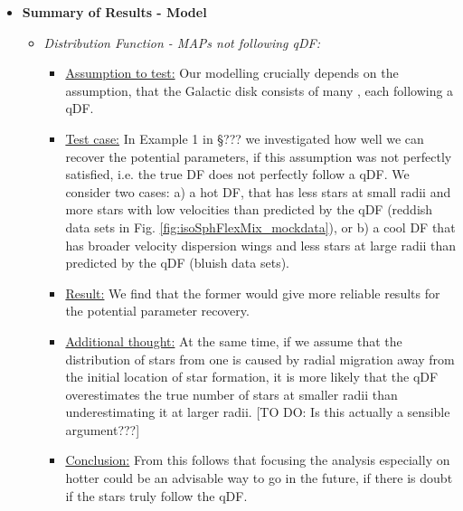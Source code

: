 \begin{itemize}
\item \textbf{Summary of Results - Model}

\begin{itemize}
\item \emph{Distribution Function - MAPs not following qDF:} 
\begin{itemize}
\item \underline{Assumption to test:} Our modelling crucially depends on the assumption, that the Galactic disk consists of many \MAPs, each following a qDF. 
\item \underline{Test case:} In Example 1 in \S ??? we investigated how well we can recover the potential parameters, if this assumption was not perfectly satisfied, i.e. the \MAPs true DF does not perfectly follow a qDF. We consider two cases: a) a hot DF, that has less stars at small radii and more stars with low velocities than predicted by the qDF (reddish data sets in Fig. \ref{fig:isoSphFlexMix_mockdata}), or b) a cool DF that has broader velocity dispersion wings and less stars at large radii than predicted by the qDF (bluish data sets). 
\item \underline{Result:} We find that the former would give more reliable results for the potential parameter recovery.
\item \underline{Additional thought:} At the same time, if we assume that the distribution of stars from one \MAP is caused by radial migration away from the initial location of star formation, it is more likely that the qDF overestimates the true number of stars at smaller radii than underestimating it at larger radii. [TO DO: Is this actually a sensible argument???] 
\item \underline{Conclusion:} From this follows that focusing the analysis especially on hotter \MAPs could be an advisable way to go in the future, if there is doubt if the stars truly follow the qDF.
\end{itemize}


\end{itemize}
\end{itemize}
